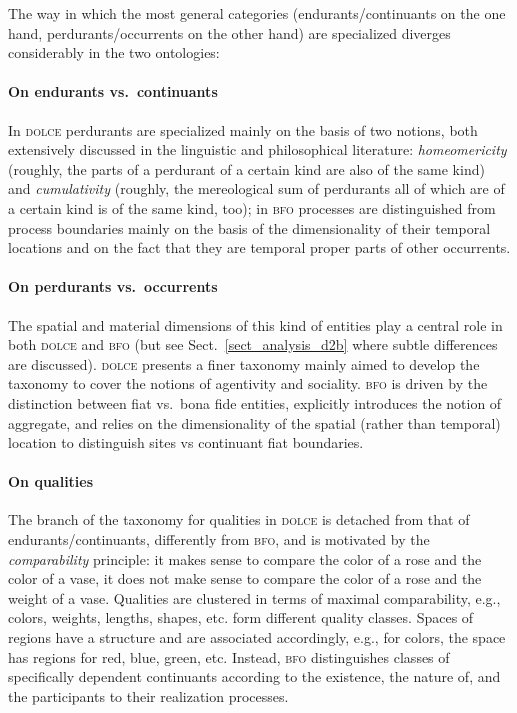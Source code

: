 \documentclass[ao]{iosart2x}
\newcommand{\dolce}{{\textsc{dolce}}}
\newcommand{\bfo}{{\textsc{bfo}}}
\begin{document}
The way in which the most general categories (endurants/continuants on the one hand, perdurants/occurrents on the other hand) are specialized
diverges considerably in the two ontologies:

\paragraph{On endurants vs.~continuants} In {\dolce} perdurants are specialized mainly on the basis of two notions, both extensively discussed in the linguistic and philosophical literature: \emph{homeomericity} (roughly, the parts of a perdurant of a 
certain kind are also of the same kind) and \emph{cumulativity} (roughly, the mereological sum of perdurants all of which are of a certain kind is of the same kind, too); in {\bfo} processes are distinguished from process boundaries mainly on the basis of the dimensionality of their temporal locations and on the fact that they are temporal proper parts of other occurrents.

\paragraph{On perdurants vs.~occurrents} The spatial and material dimensions of this kind of entities play a central role in both {\dolce} and {\bfo} (but see Sect.~\ref{sect_analysis_d2b} where subtle differences are discussed). {\dolce} presents a finer taxonomy mainly aimed to develop the taxonomy to cover the notions of agentivity and sociality. {\bfo} is driven by the distinction between fiat vs.~bona fide entities, explicitly introduces the notion of aggregate, and relies on the dimensionality of the spatial (rather than temporal) location to distinguish sites vs continuant fiat boundaries.

\paragraph{On qualities} The branch of the taxonomy for qualities in {\dolce} is detached from that of endurants/continuants, differently from {\bfo}, and is motivated by the \emph{comparability} principle: it makes sense to compare the color of a rose and the color of a vase, it does not make sense to compare the color of a rose and the weight of a vase. Qualities are clustered in terms of maximal comparability, e.g., colors, weights, lengths, shapes, etc. form different quality classes. Spaces of regions have a structure and are associated accordingly, e.g., for colors, the space has regions for red, blue, green, etc. Instead, {\bfo} distinguishes classes of specifically dependent continuants according to the existence, the nature of, and the participants to their realization processes.
\end{document}
